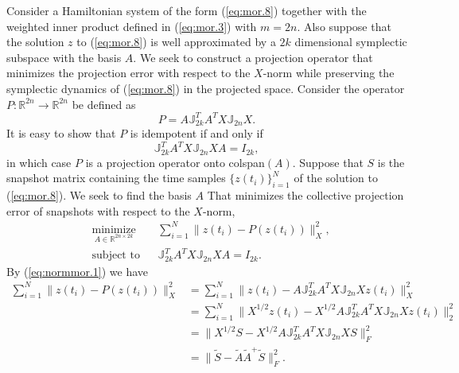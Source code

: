 Consider a Hamiltonian system of the form (\ref{eq:mor.8}) together with the weighted inner product defined in (\ref{eq:mor.3}) with $m=2n$. Also suppose that the solution $z$ to (\ref{eq:mor.8}) is well approximated by a $2k$ dimensional symplectic subspace with the basis $A$. We seek to construct a projection operator that minimizes the projection error with respect to the $X$-norm while preserving the symplectic dynamics of (\ref{eq:mor.8}) in the projected space. Consider the operator $P: \mathbb R^{2n} \to \mathbb R^{2n}$ be defined as
\begin{equation} \label{eq:normmor.1}
	P = A \mathbb J_{2k}^T A^T X \mathbb J_{2n} X.
\end{equation}
It is easy to show that $P$ is idempotent if and only if
\begin{equation} \label{eq:normmor.2}
	\mathbb J_{2k}^T A^T X \mathbb J_{2n} X A = I_{2k},
\end{equation}
in which case $P$ is a projection operator onto colspan$(A)$. Suppose that $S$ is the snapshot matrix containing the time samples $\{z(t_i)\}_{i=1}^N$ of the solution to (\ref{eq:mor.8}). We seek to find the basis $A$ That minimizes the collective projection error of snapshots with respect to the $X$-norm,
\begin{equation} \label{eq:normmor.3}
\begin{aligned}
& \underset{A\in \mathbb{R}^{2n\times 2k}}{\text{minimize}}
& & \sum_{i=1}^N \| z(t_i) - P(z(t_i)) \|_X^2, \\
& \text{subject to}
& & \mathbb J_{2k}^T A^T X \mathbb J_{2n} X A = I_{2k}.
\end{aligned}
\end{equation}
By (\ref{eq:normmor.1}) we have
\begin{equation} \label{eq:normmor.4}
\begin{aligned}
	\sum_{i=1}^N \| z(t_i) - P(z(t_i)) \|_X^2 &= \sum_{i=1}^N \| z(t_i) - A \mathbb J_{2k}^T A^T X \mathbb J_{2n} X z(t_i) \|_X^2 \\
	&= \sum_{i=1}^N \| X^{1/2}z(t_i) - X^{1/2} A \mathbb J_{2k}^T A^T X \mathbb J_{2n} X z(t_i) \|_2^2 \\
	&= \| X^{1/2} S - X^{1/2} A \mathbb J_{2k}^T A^T X \mathbb J_{2n} X S \|_F^2 \\
	&= \| \tilde S - \tilde A \tilde A ^+ \tilde S \|_F^2.
\end{aligned}
\end{equation}
